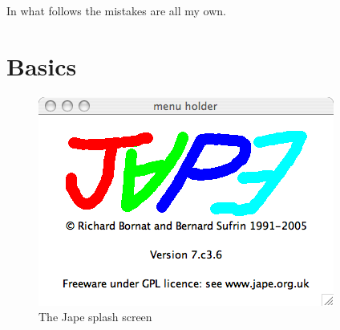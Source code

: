 \documentclass[11pt]{book}
\begin{document}
In what follows the mistakes are all my own.

\chapter{Basics}


\begin{figure}
\centering
\includegraphics[scale=0.5]{pics/splashscreen.png}
\caption{The Jape splash screen}
\label{fig:splashscreen}
\end{figure}
\end{document}
